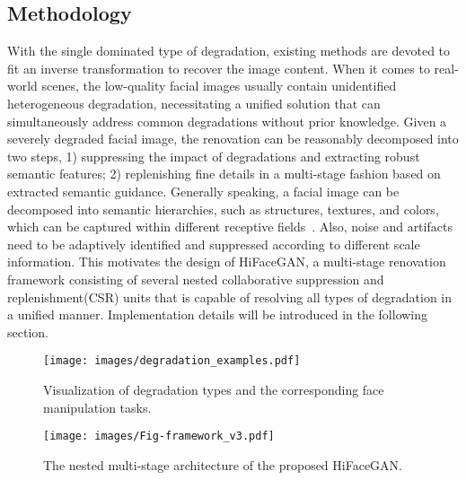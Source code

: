 \documentclass[sigconf]{acmart}
\begin{document}
\subsection{Methodology}
With the single dominated type of degradation, existing methods are devoted to fit an inverse transformation to recover the image content. When it comes to real-world scenes, the low-quality facial images usually contain unidentified heterogeneous degradation, necessitating a unified solution that can simultaneously address common degradations without prior knowledge.
Given a severely degraded facial image, the renovation can be reasonably decomposed into two steps, 1) suppressing the impact of degradations and extracting robust semantic features; 2) replenishing fine details in a multi-stage fashion based on extracted semantic guidance.
Generally speaking, a facial image can be decomposed into semantic hierarchies, such as structures, textures, and colors, which can be captured within different receptive fields~\cite{Marr1982VisionAC}. Also, noise and artifacts need to be adaptively identified and suppressed according to different scale information.
This motivates the design of HiFaceGAN, a multi-stage renovation framework consisting of several nested collaborative suppression and replenishment(CSR) units that is capable of resolving all types of degradation in a unified manner. Implementation details will be introduced in the following section.

\begin{figure}[!pt]
	\centering
	\texttt{[image: images/degradation\_examples.pdf]}
	\caption{Visualization of degradation types and the corresponding face manipulation tasks. }
	\label{fig:deg_egs}
\end{figure}


\begin{figure*}[!pt]
	\centering
\texttt{[image: images/Fig-framework\_v3.pdf]}
	\caption{The nested multi-stage architecture of the proposed HiFaceGAN.}\label{fig:network}
\end{figure*}
\end{document}
